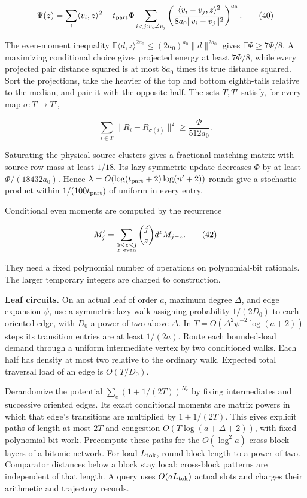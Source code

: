 \[
\Psi(z)=\sum_i\langle v_i,z\rangle^2
 -t_{\rm part}\Phi\sum_{i<j:v_i\ne v_j}
 \left(\frac{\langle v_i-v_j,z\rangle^2}
 {8a_0\|v_i-v_j\|^2}\right)^{a_0}.
 \tag{40}
\]

The even-moment inequality \(\mathbb E\langle d,z\rangle^{2a_0}\leq(2a_0)^{a_0}\|d\|^{2a_0}\) gives \(\mathbb E\Psi\geq7\Phi/8\). A maximizing conditional choice gives projected energy at least \(7\Phi/8\), while every projected pair distance squared is at most \(8a_0\) times its true distance squared. Sort the projections, take the heavier of the top and bottom eighth-tails relative to the median, and pair it with the opposite half. The sets \(T,T'\) satisfy, for every map \(\sigma:T\to T'\),

\[
\sum_{i\in T}\|R_i-R_{\sigma(i)}\|^2\geq\frac{\Phi}{512a_0}.
 \tag{41}
\]

Saturating the physical source clusters gives a fractional matching matrix with source row mass at least \(1/18\). Its lazy symmetric update decreases \(\Phi\) by at least \(\Phi/(18432a_0)\). Hence \(\lambda=O(\log(t_{\rm part}+2)\log(n'+2))\) rounds give a stochastic product within \(1/(100t_{\rm part})\) of uniform in every entry.

Conditional even moments are computed by the recurrence

\[
M'_j=\sum_{\substack{0\leq z\leq j\\z\ {\rm even}}}
                       \binom jz d^z M_{j-z}.
 \tag{42}
\]

They need a fixed polynomial number of operations on polynomial-bit rationals. The larger temporary integers are charged to construction.

\textbf{Leaf circuits.} On an actual leaf of order \(a\), maximum degree \(\Delta\), and edge expansion \(\psi\), use a symmetric lazy walk assigning probability \(1/(2D_0)\) to each oriented edge, with \(D_0\) a power of two above \(\Delta\). In \(T=O(\Delta^2\psi^{-2}\log(a+2))\) steps its transition entries are at least \(1/(2a)\). Route each bounded-load demand through a uniform intermediate vertex by two conditioned walks. Each half has density at most two relative to the ordinary walk. Expected total traversal load of an edge is \(O(T/D_0)\).

Derandomize the potential \(\sum_e(1+1/(2T))^{N_e}\) by fixing intermediates and successive oriented edges. Its exact conditional moments are matrix powers in which that edge's transitions are multiplied by \(1+1/(2T)\). This gives explicit paths of length at most \(2T\) and congestion \(O(T\log(a+\Delta+2))\), with fixed polynomial bit work. Precompute these paths for the \(O(\log^2 a)\) cross-block layers of a bitonic network. For load \(L_{\rm tok}\), round block length to a power of two. Comparator distances below a block stay local; cross-block patterns are independent of that length. A query uses \(O(aL_{\rm tok})\) actual slots and charges their arithmetic and trajectory records.

